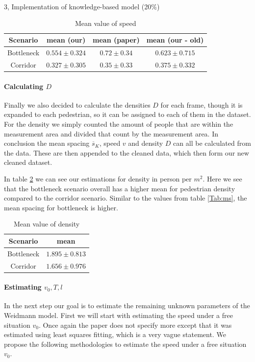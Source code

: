 \begin{task}{3, Implementation of knowledge-based model (20\%)}
\begin{table}[H]
\centering
\begin{tabular}{ |c|c|c|c| }
\hline
Scenario & mean (our) & mean (paper) & mean (our - old) \\
\hline
Bottleneck & $0.554\pm 0.324$ & $0.72\pm 0.34$ & $0.623\pm 0.715$\\
\hline
Corridor & $0.327\pm 0.305$ & $0.35\pm 0.33$ & $0.375\pm 0.332$\\
\hline
\end{tabular}
\caption{Mean value of speed}
\label{Tab:speed}
\end{table}

\paragraph{Calculating $D$}Finally we also decided to calculate the densities $D$ for each frame, though it is expanded to each pedestrian, so it can be assigned to each of them in the dataset. For the density we simply counted the amount of people that are within the measurement area and divided that count by the measurement area. In conclusion the mean spacing $\overline{s}_K$, speed $v$ and density $D$ can all be calculated from the data. These are then appended to the cleaned data, which then form our new cleaned dataset.

In table \ref{Tab:dens} we can see our estimations for density in person per $m^2$. Here we see that the bottleneck scenario overall  has a higher mean for pedestrian density compared to the corridor scenario. Similar to the values from table \ref{Tab:ms}, the mean spacing for bottleneck is higher.

\begin{table}[H]
\centering
\begin{tabular}{ |c|c| }
\hline
Scenario & mean \\
\hline
Bottleneck & $1.895\pm 0.813$\\
\hline
Corridor & $1.656\pm 0.976$\\
\hline
\end{tabular}
\caption{Mean value of density}
\label{Tab:dens}
\end{table}

\paragraph{Estimating $v_0, T, l$} In the next step our goal is to estimate the remaining unknown parameters of the Weidmann model. First we will start with estimating the speed under a free situation $v_0$. Once again the paper \cite{tordeux2020prediction} does not specify more except that it was estimated using least squares fitting, which is a very vague statement. We propose the following methodologies to estimate the speed under a free situation $v_0$.


\end{task}
